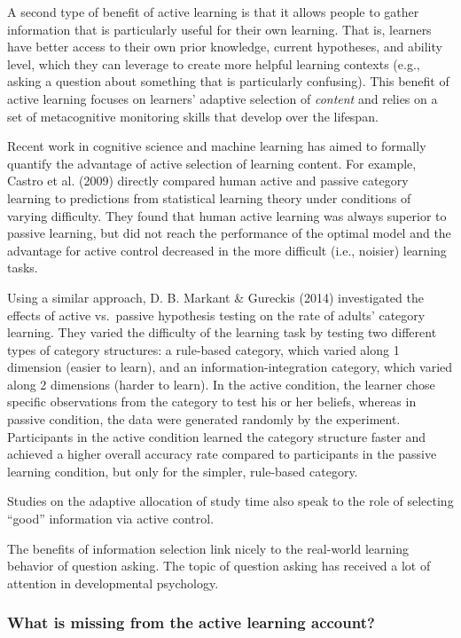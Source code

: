 \documentclass[a4paper,man,apacite,floatsintext]{apa6}
\begin{document}
A second type of benefit of active learning is that it allows people to
gather information that is particularly useful for their own learning.
That is, learners have better access to their own prior knowledge,
current hypotheses, and ability level, which they can leverage to create
more helpful learning contexts (e.g., asking a question about something
that is particularly confusing). This benefit of active learning focuses
on learners' adaptive selection of \emph{content} and relies on a set of
metacognitive monitoring skills that develop over the lifespan.

Recent work in cognitive science and machine learning has aimed to
formally quantify the advantage of active selection of learning content.
For example, Castro et al. (2009) directly compared human active and
passive category learning to predictions from statistical learning
theory under conditions of varying difficulty. They found that human
active learning was always superior to passive learning, but did not
reach the performance of the optimal model and the advantage for active
control decreased in the more difficult (i.e., noisier) learning tasks.

Using a similar approach, D. B. Markant \& Gureckis (2014) investigated
the effects of active vs.~passive hypothesis testing on the rate of
adults' category learning. They varied the difficulty of the learning
task by testing two different types of category structures: a rule-based
category, which varied along 1 dimension (easier to learn), and an
information-integration category, which varied along 2 dimensions
(harder to learn). In the active condition, the learner chose specific
observations from the category to test his or her beliefs, whereas in
passive condition, the data were generated randomly by the experiment.
Participants in the active condition learned the category structure
faster and achieved a higher overall accuracy rate compared to
participants in the passive learning condition, but only for the
simpler, rule-based category.

Studies on the adaptive allocation of study time also speak to the role
of selecting ``good'' information via active control.

The benefits of information selection link nicely to the real-world
learning behavior of question asking. The topic of question asking has
received a lot of attention in developmental psychology.

\subsubsection{What is missing from the active learning
account?}\label{what-is-missing-from-the-active-learning-account}
\end{document}
